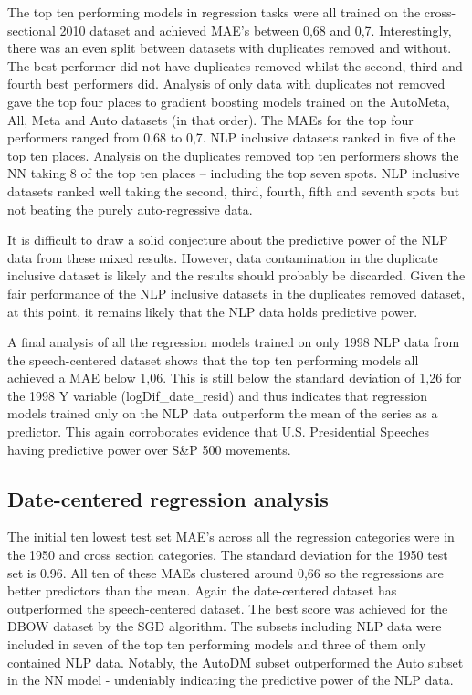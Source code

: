 \documentclass[11pt,preprint, authoryear]{elsarticle}
\numberwithin{equation}{section}
\numberwithin{figure}{section}
\numberwithin{table}{section}
\begin{document}
The top ten performing models in regression tasks were all trained on
the cross-sectional 2010 dataset and achieved MAE's between 0,68 and
0,7. Interestingly, there was an even split between datasets with
duplicates removed and without. The best performer did not have
duplicates removed whilst the second, third and fourth best performers
did. Analysis of only data with duplicates not removed gave the top four
places to gradient boosting models trained on the AutoMeta, All, Meta
and Auto datasets (in that order). The MAEs for the top four performers
ranged from 0,68 to 0,7. NLP inclusive datasets ranked in five of the
top ten places. Analysis on the duplicates removed top ten performers
shows the NN taking 8 of the top ten places -- including the top seven
spots. NLP inclusive datasets ranked well taking the second, third,
fourth, fifth and seventh spots but not beating the purely
auto-regressive data.

It is difficult to draw a solid conjecture about the predictive power of
the NLP data from these mixed results. However, data contamination in
the duplicate inclusive dataset is likely and the results should
probably be discarded. Given the fair performance of the NLP inclusive
datasets in the duplicates removed dataset, at this point, it remains
likely that the NLP data holds predictive power.

A final analysis of all the regression models trained on only 1998 NLP
data from the speech-centered dataset shows that the top ten performing
models all achieved a MAE below 1,06. This is still below the standard
deviation of 1,26 for the 1998 Y variable (logDif\_date\_resid) and thus
indicates that regression models trained only on the NLP data outperform
the mean of the series as a predictor. This again corroborates evidence
that U.S. Presidential Speeches having predictive power over S\&P 500
movements.

\hypertarget{date-centered-regression-analysis}{%
\subsection{Date-centered regression
analysis}\label{date-centered-regression-analysis}}

The initial ten lowest test set MAE's across all the regression
categories were in the 1950 and cross section categories. The standard
deviation for the 1950 test set is 0.96. All ten of these MAEs clustered
around 0,66 so the regressions are better predictors than the mean.
Again the date-centered dataset has outperformed the speech-centered
dataset. The best score was achieved for the DBOW dataset by the SGD
algorithm. The subsets including NLP data were included in seven of the
top ten performing models and three of them only contained NLP data.
Notably, the AutoDM subset outperformed the Auto subset in the NN model
- undeniably indicating the predictive power of the NLP data.
\end{document}
